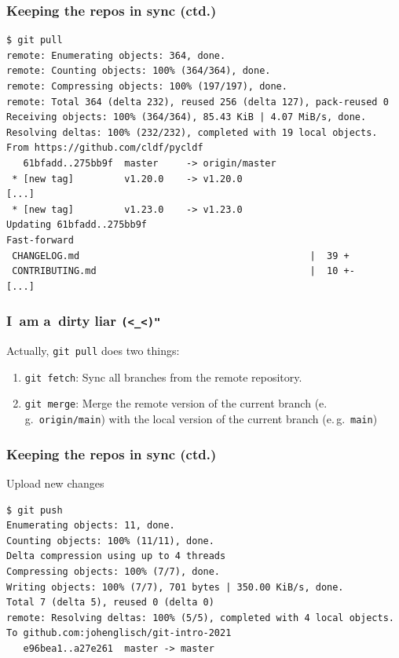 \documentclass[12pt]{beamer}
\begin{document}
\begin{frame}[fragile]
  \frametitle{Keeping the repos in sync (ctd.)}

  {\footnotesize{}%
    \begin{verbatim}
$ git pull
remote: Enumerating objects: 364, done.
remote: Counting objects: 100% (364/364), done.
remote: Compressing objects: 100% (197/197), done.
remote: Total 364 (delta 232), reused 256 (delta 127), pack-reused 0
Receiving objects: 100% (364/364), 85.43 KiB | 4.07 MiB/s, done.
Resolving deltas: 100% (232/232), completed with 19 local objects.
From https://github.com/cldf/pycldf
   61bfadd..275bb9f  master     -> origin/master
 * [new tag]         v1.20.0    -> v1.20.0
[...]
 * [new tag]         v1.23.0    -> v1.23.0
Updating 61bfadd..275bb9f
Fast-forward
 CHANGELOG.md                                         |  39 +
 CONTRIBUTING.md                                      |  10 +-
[...]
    \end{verbatim}
  }
\end{frame}

\begin{frame}[fragile]
  \frametitle{I~am a~dirty liar \texttt{(<\_<)"}}

  Actually, \texttt{git pull} does two things:
  \begin{enumerate}
    \item\texttt{git fetch}: Sync all branches from the remote repository.
    \item\texttt{git merge}: Merge the remote version of the current branch
      (e.\,g.\ \texttt{origin/main}) with the local version of the current
      branch (e.\,g.\ \texttt{main})
  \end{enumerate}
\end{frame}

\begin{frame}[fragile]
  \frametitle{Keeping the repos in sync (ctd.)}

  \begin{block}{Upload new changes}
    {\footnotesize{}%
      \begin{verbatim}
$ git push
Enumerating objects: 11, done.
Counting objects: 100% (11/11), done.
Delta compression using up to 4 threads
Compressing objects: 100% (7/7), done.
Writing objects: 100% (7/7), 701 bytes | 350.00 KiB/s, done.
Total 7 (delta 5), reused 0 (delta 0)
remote: Resolving deltas: 100% (5/5), completed with 4 local objects.
To github.com:johenglisch/git-intro-2021
   e96bea1..a27e261  master -> master
      \end{verbatim}%
    }
  \end{block}
\end{frame}
\end{document}
